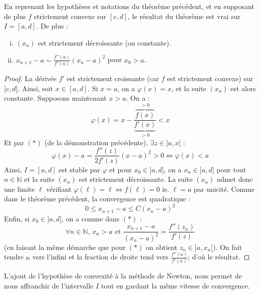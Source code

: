 
	\begin{corollary}
		En reprenant les hypothèses et notations du théorème précédent, et en supposant de plus $f$ strictement convexe sur $[c, d]$, le résultat du théorème est vrai sur $I = [a, d]$. De plus :
		\begin{enumerate}[(i)]
			\item $(x_n)$ est strictement décroissante (ou constante).
			\item $x_{n+1} - a \sim \frac{f''(a)}{f'(a)} (x_n - a)^2$ pour $x_0 > a$.
		\end{enumerate}
	\end{corollary}

	\begin{proof}
		La dérivée $f'$ est strictement croissante (car $f$ est strictement convexe) sur $]c, d[$. Ainsi, soit $x \in [a, d]$. Si $x = a$, on a $\varphi(x) = x$, et la suite $(x_n)$ est alors constante. Supposons maintenant $x > a$. On a :
		\[ \varphi(x) = x - \frac{\overbrace{f(x)}^{> 0}}{\underbrace{f'(x)}_{> 0}} < x \]
		Et par $(*)$ (de la démonstration précédente), $\exists z \in ]a, x[$ :
		\[ \varphi(x) - a = \frac{f''(z)}{2f'(z)} (x-a)^2 > 0 \iff \varphi(x) < a \]
		Ainsi, $I = [a, d]$ est stable par $\varphi$ et pour $x_0 \in ]a, d]$, on a $x_n \in ]a, d]$ pour tout $n \in \mathbb{N}$ et la suite $(x_n)$ est strictement décroissante. La suite $(x_n)$ admet donc une limite $\ell$ vérifiant $\varphi(\ell) = \ell \iff f(\ell) = 0$ ie. $\ell = a$ par unicité. Comme dans le théorème précédent, la convergence est quadratique :
		\[ 0 \leq x_{n+1} - a \leq C (x_n - a)^2 \]
		Enfin, si $x_0 \in ]a, d]$, on a comme dans $(*)$ :
		\[ \forall n \in \mathbb{N}, \, x_n > a \text{ et } \frac{x_{n+1} - a}{(x_n - a)^2} = \frac{f''(z_n)}{f'(z)} \]
		(en faisant la même démarche que pour $(*)$ on obtient $z_n \in ]a, x_n[$). On fait tendre $n$ vers l'infini et la fraction de droite tend vers $\frac{f''(a)}{f'(a)}$; d'où le résultat.
	\end{proof}

	\begin{remark}
		L'ajout de l'hypothèse de convexité à la méthode de Newton, nous permet de nous affranchir de l'intervalle $I$ tout en gardant la même vitesse de convergence.
	\end{remark}

